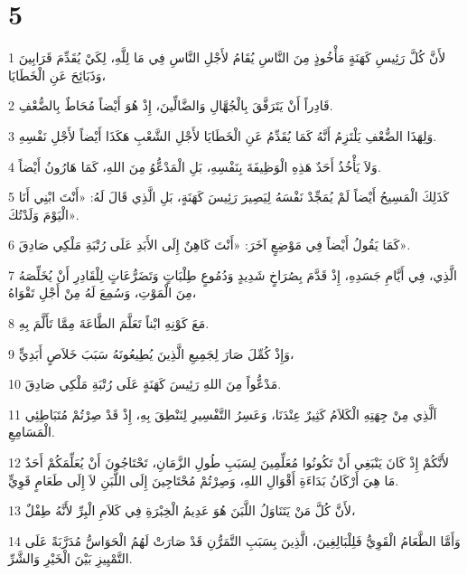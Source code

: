 \chapter{5}

\par 1 لأَنَّ كُلَّ رَئِيسِ كَهَنَةٍ مَأْخُوذٍ مِنَ النَّاسِ يُقَامُ لأَجْلِ النَّاسِ فِي مَا لِلَّهِ، لِكَيْ يُقَدِّمَ قَرَابِينَ وَذَبَائِحَ عَنِ الْخَطَايَا،
\par 2 قَادِراً أَنْ يَتَرَفَّقَ بِالْجُهَّالِ وَالضَّالِّينَ، إِذْ هُوَ أَيْضاً مُحَاطٌ بِالضُّعْفِ.
\par 3 وَلِهَذَا الضُّعْفِ يَلْتَزِمُ أَنَّهُ كَمَا يُقَدِّمُ عَنِ الْخَطَايَا لأَجْلِ الشَّعْبِ هَكَذَا أَيْضاً لأَجْلِ نَفْسِهِ.
\par 4 وَلاَ يَأْخُذُ أَحَدٌ هَذِهِ الْوَظِيفَةَ بِنَفْسِهِ، بَلِ الْمَدْعُّوُ مِنَ اللهِ، كَمَا هَارُونُ أَيْضاً.
\par 5 كَذَلِكَ الْمَسِيحُ أَيْضاً لَمْ يُمَجِّدْ نَفْسَهُ لِيَصِيرَ رَئِيسَ كَهَنَةٍ، بَلِ الَّذِي قَالَ لَهُ: «أَنْتَ ابْنِي أَنَا الْيَوْمَ وَلَدْتُكَ».
\par 6 كَمَا يَقُولُ أَيْضاً فِي مَوْضِعٍ آخَرَ: «أَنْتَ كَاهِنٌ إِلَى الأَبَدِ عَلَى رُتْبَةِ مَلْكِي صَادِقَ».
\par 7 الَّذِي، فِي أَيَّامِ جَسَدِهِ، إِذْ قَدَّمَ بِصُرَاخٍ شَدِيدٍ وَدُمُوعٍ طِلْبَاتٍ وَتَضَرُّعَاتٍ لِلْقَادِرِ أَنْ يُخَلِّصَهُ مِنَ الْمَوْتِ، وَسُمِعَ لَهُ مِنْ أَجْلِ تَقْوَاهُ،
\par 8 مَعَ كَوْنِهِ ابْناً تَعَلَّمَ الطَّاعَةَ مِمَّا تَأَلَّمَ بِهِ.
\par 9 وَإِذْ كُمِّلَ صَارَ لِجَمِيعِ الَّذِينَ يُطِيعُونَهُ سَبَبَ خَلاَصٍ أَبَدِيٍّ،
\par 10 مَدْعُّواً مِنَ اللهِ رَئِيسَ كَهَنَةٍ عَلَى رُتْبَةِ مَلْكِي صَادِقَ.
\par 11 اَلَّذِي مِنْ جِهَتِهِ الْكَلاَمُ كَثِيرٌ عِنْدَنَا، وَعَسِرُ التَّفْسِيرِ لِنَنْطِقَ بِهِ، إِذْ قَدْ صِرْتُمْ مُتَبَاطِئِي الْمَسَامِعِ.
\par 12 لأَنَّكُمْ إِذْ كَانَ يَنْبَغِي أَنْ تَكُونُوا مُعَلِّمِينَ لِسَبَبِ طُولِ الزَّمَانِ، تَحْتَاجُونَ أَنْ يُعَلِّمَكُمْ أَحَدٌ مَا هِيَ أَرْكَانُ بَدَاءَةِ أَقْوَالِ اللهِ، وَصِرْتُمْ مُحْتَاجِينَ إِلَى اللَّبَنِ لاَ إِلَى طَعَامٍ قَوِيٍّ.
\par 13 لأَنَّ كُلَّ مَنْ يَتَنَاوَلُ اللَّبَنَ هُوَ عَدِيمُ الْخِبْرَةِ فِي كَلاَمِ الْبِرِّ لأَنَّهُ طِفْلٌ،
\par 14 وَأَمَّا الطَّعَامُ الْقَوِيُّ فَلِلْبَالِغِينَ، الَّذِينَ بِسَبَبِ التَّمَرُّنِ قَدْ صَارَتْ لَهُمُ الْحَوَاسُّ مُدَرَّبَةً عَلَى التَّمْيِيزِ بَيْنَ الْخَيْرِ وَالشَّرِّ.

